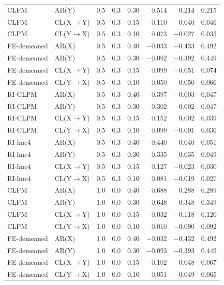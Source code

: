 \documentclass[12pt]{article}
\begin{document}
\begin{table}[H]
\begin{tabular}[t]{llrrrrrr}
CLPM & AR(Y) & 0.5 & 0.3 & 0.30 & 0.514 & 0.214 & 0.215\\
CLPM & CL(X$\rightarrow$Y) & 0.5 & 0.3 & 0.15 & 0.110 & $-$0.040 & 0.046\\
CLPM & CL(Y$\rightarrow$X) & 0.5 & 0.3 & 0.10 & 0.073 & $-$0.027 & 0.035\\
\addlinespace
FE-demeaned & AR(X) & 0.5 & 0.3 & 0.40 & $-$0.033 & $-$0.433 & 0.492\\
FE-demeaned & AR(Y) & 0.5 & 0.3 & 0.30 & $-$0.092 & $-$0.392 & 0.449\\
FE-demeaned & CL(X$\rightarrow$Y) & 0.5 & 0.3 & 0.15 & 0.099 & $-$0.051 & 0.074\\
FE-demeaned & CL(Y$\rightarrow$X) & 0.5 & 0.3 & 0.10 & 0.050 & $-$0.050 & 0.066\\
RI-CLPM & AR(X) & 0.5 & 0.3 & 0.40 & 0.397 & $-$0.003 & 0.047\\
\addlinespace
RI-CLPM & AR(Y) & 0.5 & 0.3 & 0.30 & 0.302 & 0.002 & 0.047\\
RI-CLPM & CL(X$\rightarrow$Y) & 0.5 & 0.3 & 0.15 & 0.152 & 0.002 & 0.039\\
RI-CLPM & CL(Y$\rightarrow$X) & 0.5 & 0.3 & 0.10 & 0.099 & $-$0.001 & 0.036\\
RI-lme4 & AR(X) & 0.5 & 0.3 & 0.40 & 0.440 & 0.040 & 0.051\\
RI-lme4 & AR(Y) & 0.5 & 0.3 & 0.30 & 0.335 & 0.035 & 0.049\\
\addlinespace
RI-lme4 & CL(X$\rightarrow$Y) & 0.5 & 0.3 & 0.15 & 0.127 & $-$0.023 & 0.030\\
RI-lme4 & CL(Y$\rightarrow$X) & 0.5 & 0.3 & 0.10 & 0.081 & $-$0.019 & 0.027\\
CLPM & AR(X) & 1.0 & 0.0 & 0.40 & 0.688 & 0.288 & 0.289\\
CLPM & AR(Y) & 1.0 & 0.0 & 0.30 & 0.648 & 0.348 & 0.349\\
CLPM & CL(X$\rightarrow$Y) & 1.0 & 0.0 & 0.15 & 0.032 & $-$0.118 & 0.120\\
\addlinespace
CLPM & CL(Y$\rightarrow$X) & 1.0 & 0.0 & 0.10 & 0.010 & $-$0.090 & 0.092\\
FE-demeaned & AR(X) & 1.0 & 0.0 & 0.40 & $-$0.032 & $-$0.432 & 0.492\\
FE-demeaned & AR(Y) & 1.0 & 0.0 & 0.30 & $-$0.093 & $-$0.393 & 0.449\\
FE-demeaned & CL(X$\rightarrow$Y) & 1.0 & 0.0 & 0.15 & 0.102 & $-$0.048 & 0.067\\
FE-demeaned & CL(Y$\rightarrow$X) & 1.0 & 0.0 & 0.10 & 0.051 & $-$0.049 & 0.065\\

\end{tabular}
\end{table}
\end{document}
